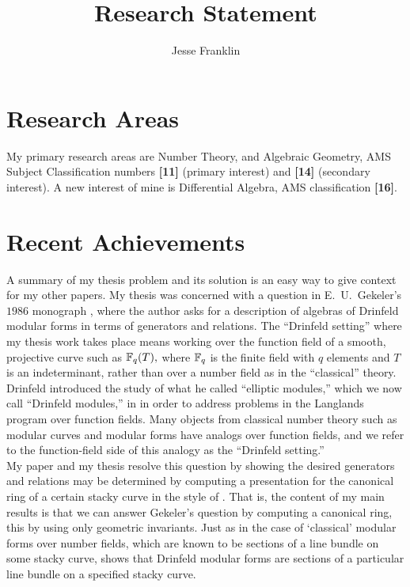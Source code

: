 \documentclass[12pt]{amsart}
\begin{document}
	\title{Research Statement}
	\author{Jesse Franklin}
	\maketitle
	
	\section{Research Areas}
	
	My primary research areas are Number Theory, and Algebraic Geometry, AMS Subject Classification numbers \textbf{[11]} (primary interest) and \textbf{[14]} (secondary interest). A new interest of mine is Differential Algebra, AMS classification \textbf{[16]}.
	
	\section{Recent Achievements}
	
	A summary of my thesis problem and its solution is an easy way to give context for my other papers. My thesis was concerned with a question in E.\ U.\ Gekeler's $1986$ monograph \cite[Page $\mathrm{XIII}$]{Gekeler-Curves}, where the author asks for a description of algebras of Drinfeld modular forms in terms of generators and relations. The ``Drinfeld setting'' where my thesis work takes place means working over the function field of a smooth, projective curve such as $\mathbb{ F }_q(T),$ where $\mathbb{ F }_q$ is the finite field with $q$ elements and $T$ is an indeterminant, rather than over a number field as in the ``classical'' theory. Drinfeld introduced the study of what he called ``elliptic modules,'' which we now call ``Drinfeld modules,'' in \cite{Drinfeld-elliptic-modules} in order to address problems in the Langlands program over function fields. Many objects from classical number theory such as modular curves and modular forms have analogs over function fields, and we refer to the function-field side of this analogy as the ``Drinfeld setting.''\\
	
	My paper \cite{Franklin-geometry-Drinfeld-modular-forms} and my thesis \cite{Franklin-thesis} resolve this question by showing the desired generators and relations may be determined by computing a presentation for the canonical ring of a certain stacky curve in the style of \cite{VZB}. That is, the content of my main results \cite[Theorems $6.1$ and $6.11$]{Franklin-geometry-Drinfeld-modular-forms} is that we can answer Gekeler's question by computing a canonical ring, this by using only geometric invariants. Just as in the case of `classical' modular forms over number fields, which are known to be sections of a line bundle on some stacky curve, \cite[Theorem $6.1$]{Franklin-geometry-Drinfeld-modular-forms} shows that Drinfeld modular forms are sections of a particular line bundle on a specified stacky curve.\\
	
\end{document}
